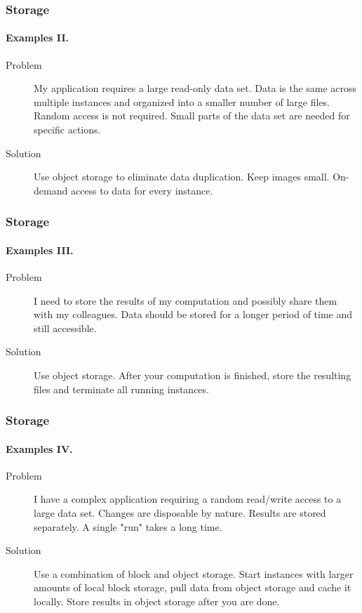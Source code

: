 \begin{frame}
  \frametitle{Storage}
  \framesubtitle{Examples II.}

  \begin{description}
    \item[Problem] My application requires a large read-only data set. Data is the same across multiple instances and
                   organized into a smaller number of large files. Random access is not required. Small parts of the data set
                   are needed for specific actions.
    \item[Solution] Use object storage to eliminate data duplication. Keep images small. On-demand access to data for every instance.
  \end{description}
\end{frame}

\begin{frame}
  \frametitle{Storage}
  \framesubtitle{Examples III.}
  \begin{description}
    \item[Problem] I need to store the results of my computation and possibly share them with my colleagues. Data should be stored
                   for a longer period of time and still accessible.
    \item[Solution] Use object storage. After your computation is finished, store the resulting files and terminate all running instances.
  \end{description}
\end{frame}

\begin{frame}
  \frametitle{Storage}
  \framesubtitle{Examples IV.}

  \begin{description}
    \item[Problem] I have a complex application requiring a random read/write access to a large data set. Changes are disposable
                   by nature. Results are stored separately. A single "run" takes a long time.
    \item[Solution] Use a combination of block and object storage. Start instances with larger amounts of local block storage,
                    pull data from object storage and cache it locally. Store results in object storage after you are done.
  \end{description}
\end{frame}

